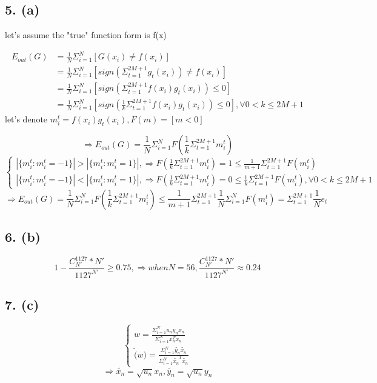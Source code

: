 \documentclass[12pt,a4paper]{article}
\begin{document}
\subsection{5. (a)}
let's assume the "true" function form is f(x)


\begin{align}
    E_{out}(G) &= \frac{1}{N} \Sigma_{i=1}^N [ G(x_i) \neq f(x_i) ] \\
               &= \frac{1}{N} \Sigma_{i=1}^N [ sign(\Sigma_{t=1}^{2M+1} g_t(x_i)) \neq f(x_i) ] \\
               &= \frac{1}{N} \Sigma_{i=1}^N [ sign(\Sigma_{t=1}^{2M+1} f(x_i)g_t(x_i)) \le 0 ] \\
               &= \frac{1}{N} \Sigma_{i=1}^N [ sign( \frac{1}{k} \Sigma_{t=1}^{2M+1} f(x_i)g_t(x_i)) \le 0 ], \forall 0 < k \le 2M+1
\end{align}
let's denote $m_i^t = f(x_i)g_t(x_i), F(m) = [m < 0]$

\[
\Rightarrow E_{out}(G) = \frac{1}{N} \Sigma_{i=1}^N F( \frac{1}{k} \Sigma_{t=1}^{2M+1} m_i^t)
\]
\[
\begin{cases}
    |\{m_i^t: m_i^t=-1\}| > |\{m_i^t: m_i^t=1\}|, \Rightarrow  F( \frac{1}{k} \Sigma_{t=1}^{2M+1} m_i^t) = 1 \le \frac{1}{m+1} \Sigma_{t=1}^{2M+1} F(m_i^t) \\ 
    |\{m_i^t: m_i^t=-1\}| < |\{m_i^t: m_i^t=1\}|, \Rightarrow  F( \frac{1}{k} \Sigma_{t=1}^{2M+1} m_i^t) = 0 \le \frac{1}{k} \Sigma_{t=1}^{2M+1} F(m_i^t), \forall 0 < k \le 2M+1
\end{cases}
\]
\[
\Rightarrow E_{out}(G) = \frac{1}{N} \Sigma_{i=1}^N F( \frac{1}{k} \Sigma_{t=1}^{2M+1} m_i^t) \le \frac{1}{m+1} \Sigma_{t=1}^{2M+1} \frac{1}{N} \Sigma_{i=1}^N  F(m_i^t) = \Sigma_{t=1}^{2M+1} \frac{1}{N} e_t
\]
\subsection{6. (b)}
\[
1 - \frac{C_{N'}^1127 * N'}{1127^{N'}} \ge 0.75, \Rightarrow when N=56, \frac{C_{N'}^1127 * N'}{1127^{N'}} \approx 0.24
\]
\subsection{7. (c)}
\[
\begin{cases}
    w = \frac{ \Sigma_{i=1}^N u_ny_nx_n}{ \Sigma_{i=1}^N x_n^Tx_n} \\
    \tilde(w) = \frac{ \Sigma_{i=1}^N \tilde{y_n}\tilde{x_n} }{ \Sigma_{i=1}^N \tilde{x_n}^T\tilde{x_n} } 
\end{cases}
\]
\[
\Rightarrow \tilde{x_n} = \sqrt{u_n}x_n, \tilde{y_n} = \sqrt{u_n}y_n
\]
\end{document}
